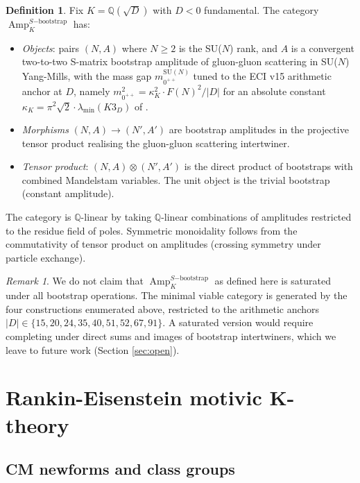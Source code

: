\documentclass[11pt]{amsart}
\theoremstyle{definition}
\newtheorem{definition}[theorem]{Definition}
\theoremstyle{remark}
\newtheorem{remark}[theorem]{Remark}
\DeclareMathOperator{\Amp}{Amp}
\newcommand{\Q}{\mathbb{Q}}
\begin{document}
\begin{definition}\label{def:Amp-K}
Fix $K = \Q(\sqrt{D})$ with $D < 0$ fundamental. The category
$\Amp_K^{S\mathrm{-bootstrap}}$ has:
\begin{itemize}
\item \emph{Objects}: pairs $(N, A)$ where $N \ge 2$ is the SU($N$)
rank, and $A$ is a convergent two-to-two S-matrix bootstrap amplitude
of gluon-gluon scattering in SU($N$) Yang-Mills, with the mass gap
$m_{0^{++}}^{\mathrm{SU}(N)}$ tuned to the ECI v15 arithmetic anchor at $D$,
namely $m_{0^{++}}^2 = \kappa_K^2 \cdot F(N)^2 / |D|$ for an
absolute constant $\kappa_K = \pi^2 \sqrt 2 \cdot \lambda_{\min}(K3_D)$
of \cite{Phase8v12}.
\item \emph{Morphisms} $(N, A) \to (N', A')$ are bootstrap amplitudes
in the projective tensor product realising the gluon-gluon scattering
intertwiner.
\item \emph{Tensor product}: $(N, A) \otimes (N', A')$ is the direct
product of bootstraps with combined Mandelstam variables. The unit
object is the trivial bootstrap (constant amplitude).
\end{itemize}
The category is $\Q$-linear by taking $\Q$-linear combinations of
amplitudes restricted to the residue field of poles. Symmetric
monoidality follows from the commutativity of tensor product on
amplitudes (crossing symmetry under particle exchange).
\end{definition}

\begin{remark}\label{rk:Amp-restrictive}
We do not claim that $\Amp_K^{S\mathrm{-bootstrap}}$ as defined here is
saturated under all bootstrap operations. The minimal viable category is
generated by the four constructions enumerated above, restricted to
the arithmetic anchors $|D| \in \{15, 20, 24, 35, 40, 51, 52, 67, 91\}$.
A saturated version would require completing under direct sums and
images of bootstrap intertwiners, which we leave to future work
(Section \ref{sec:open}).
\end{remark}

\section{Rankin-Eisenstein motivic K-theory}\label{sec:motivic}

\subsection{CM newforms and class groups}\label{ss:cm-newforms}
\end{document}
